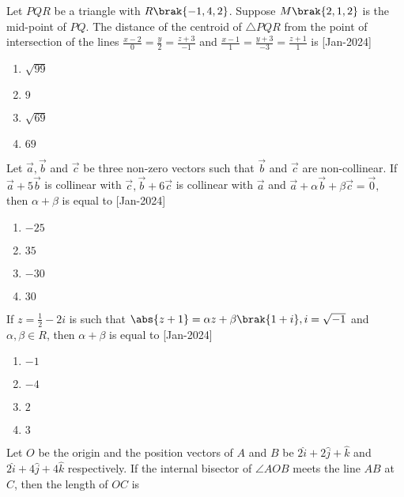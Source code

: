  \iffalse
    \title{2024}
    \author{EE24BTECH11021}
    \section{mcq-single}
\fi
    \item Let $PQR$ be a triangle with $R\brak{-1,4,2}$. Suppose $M\brak{2,1,2}$ is the mid-point of $PQ$. The distance of the centroid of $\triangle PQR$ from the point of intersection of the lines $\frac{x-2}{0}=\frac{y}{2}=\frac{z+3}{-1}$ and $\frac{x-1}{1}=\frac{y+3}{-3}=\frac{z+1}{1}$ is
    \hfill{[Jan-2024]}
        \begin{enumerate}
            \item $\sqrt{99}$
            \item $9$
            \item $\sqrt{69}$
            \item $69$
        \end{enumerate}
    \item Let $\overrightarrow{a},\overrightarrow{b}$ and $\overrightarrow{c}$ be three non-zero vectors such that $\overrightarrow{b}$ and $\overrightarrow{c}$ are non-collinear. If $\overrightarrow{a}+5\overrightarrow{b}$ is collinear with $\overrightarrow{c},\overrightarrow{b}+6\overrightarrow{c}$ is collinear with $\overrightarrow{a}$ and $\overrightarrow{a}+\alpha\overrightarrow{b}+\beta\overrightarrow{c}=\overrightarrow{0},$ then $\alpha+\beta$ is equal to 
    \hfill{[Jan-2024]}
        \begin{enumerate}
            \item $-25$
            \item $35$
            \item $-30$
            \item $30$
        \end{enumerate}
    \item If $z=\frac{1}{2}-2i$ is such that $\abs{z+1}=\alpha z+\beta\brak{1+i},i=\sqrt{-1}$ and $\alpha,\beta\in R$, then $\alpha+\beta$ is equal to 
    \hfill{[Jan-2024]}
        \begin{enumerate}
            \item $-1$
            \item $-4$
            \item $2$
            \item $3$
        \end{enumerate}
    \item Let $O$ be the origin and the position vectors of $A$ and $B$ be $2\hat{i}+2\hat{j}+\hat{k}$ and $2\hat{i}+4\hat{j}+4\hat{k}$ respectively. If the internal bisector of $\angle AOB$ meets the line $AB$ at $C$, then the length of $OC$ is
